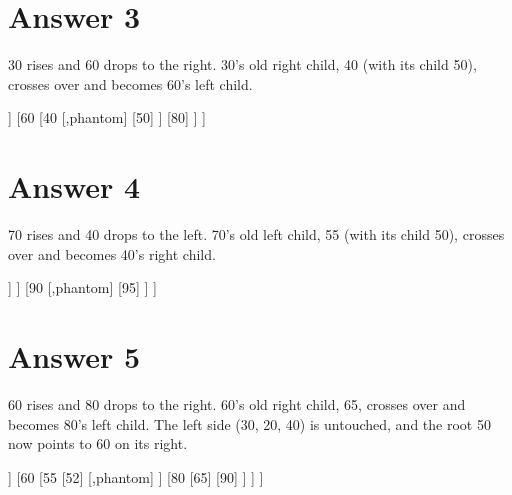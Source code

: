 \documentclass[11pt]{article}
\begin{document}
	\section*{Answer 3}
	30 rises and 60 drops to the right. 30's old right child, 40 (with its child 50), crosses over and becomes 60's left child.
	\begin{center}
		\begin{forest}
			[30
			[20
			[10]
			[,phantom]
			]
			[60
			[40
			[,phantom]
			[50]
			]
			[80]
			]
			]
		\end{forest}
	\end{center}
	
	\section*{Answer 4}
	70 rises and 40 drops to the left. 70's old left child, 55 (with its child 50), crosses over and becomes 40's right child.
	\begin{center}
		\begin{forest}
			[70
			[40
			[20]
			[55
			[50]
			[,phantom]
			]
			]
			[90
			[,phantom]
			[95]
			]
			]
		\end{forest}
	\end{center}
	
	\section*{Answer 5}
	60 rises and 80 drops to the right. 60's old right child, 65, crosses over and becomes 80's left child. The left side (30, 20, 40) is untouched, and the root 50 now points to 60 on its right.
	\begin{center}
		\begin{forest}
			[50
			[30
			[20]
			[40]
			]
			[60
			[55
			[52]
			[,phantom]
			]
			[80
			[65]
			[90]
			]
			]
			]
		\end{forest}
	\end{center}
	
\end{document}
